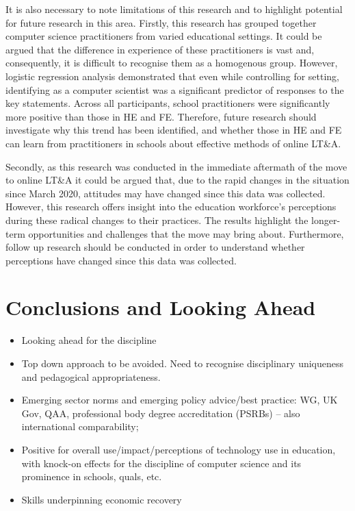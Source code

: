 \documentclass[sigconf]{acmart}
\begin{document}
It is also necessary to note limitations of this research and to
highlight potential for future research in this area. Firstly, this
research has grouped together computer science practitioners from
varied educational settings. It could be argued that the difference in
experience of these practitioners is vast and, consequently, it is
difficult to recognise them as a homogenous group. However, logistic
regression analysis demonstrated that even while controlling for
setting, identifying as a computer scientist was a significant
predictor of responses to the key statements. Across all participants,
school practitioners were significantly more positive than those in HE
and FE. Therefore, future research should investigate why this trend
has been identified, and whether those in HE and FE can learn from
practitioners in schools about effective methods of online LT\&A.

Secondly, as this research was conducted in the immediate aftermath of
the move to online LT\&A it could be argued that, due to the rapid
changes in the situation since March 2020, attitudes may have changed
since this data was collected. However, this research offers insight
into the education workforce’s perceptions during these radical
changes to their practices. The results highlight the longer-term
opportunities and challenges that the move may bring
about. Furthermore, follow up research should be conducted in order to
understand whether perceptions have changed since this data was
collected.

\section{Conclusions and Looking Ahead}\label{conclusions}

\begin{itemize}
\item Looking ahead for the discipline
\item Top down approach to be avoided. Need to recognise disciplinary
uniqueness and pedagogical appropriateness.
\item Emerging sector norms and emerging policy advice/best practice:
WG, UK Gov, QAA, professional body degree accreditation (PSRBs) – also
international comparability;
\item Positive for overall use/impact/perceptions of technology use in
education, with knock-on effects for the discipline of computer
science and its prominence in schools, quals, etc.
\item Skills underpinning economic recovery
\end{itemize}





\end{document}
